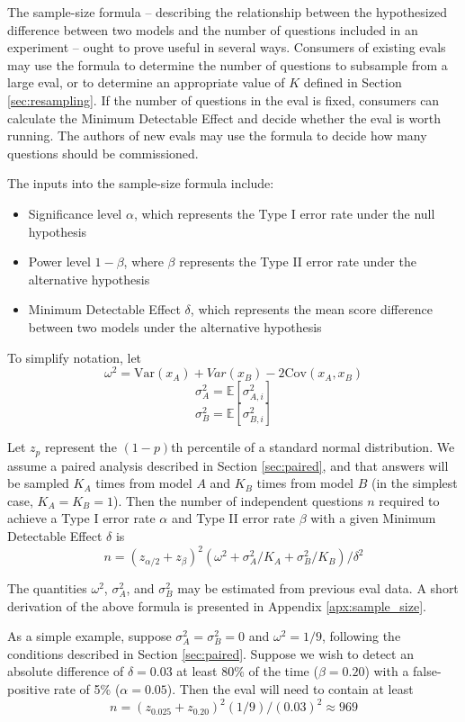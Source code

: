 \documentclass[11pt, oneside]{article}   	%
\newcommand{\E}{\mathbb{E}}
\newcommand{\Var}{\mathrm{Var}}
\newcommand{\Cov}{\mathrm{Cov}}
\begin{document}
The sample-size formula -- describing the relationship between the hypothesized difference between two models and the number of questions included in an experiment -- ought to prove useful in several ways. Consumers of existing evals may use the formula to determine the number of questions to subsample from a large eval, or to determine an appropriate value of $K$ defined in Section \ref{sec:resampling}. If the number of questions in the eval is fixed, consumers can calculate the Minimum Detectable Effect and decide whether the eval is worth running. The authors of new evals may use the formula to decide how many questions should be commissioned.

The inputs into the sample-size formula include:

\begin{itemize}
\item Significance level $\alpha$, which represents the Type I error rate under the null hypothesis
\item Power level $1-\beta$, where $\beta$ represents the Type II error rate under the alternative hypothesis
\item Minimum Detectable Effect $\delta$, which represents the mean score difference between two models under the alternative hypothesis
\end{itemize}

To simplify notation, let
\[
\omega^2 = \Var(x_A) + Var(x_B) - 2\Cov(x_A, x_B)
\]
\[
\sigma_A^2=\E[\sigma_{A, i}^2]
\]
\[
\sigma_B^2=\E[\sigma_{B, i}^2]
\]

Let $z_p$ represent the $(1-p)$th percentile of a standard normal distribution. We assume a paired analysis described in Section \ref{sec:paired}, and that answers will be sampled $K_A$ times from model $A$ and $K_B$ times from model $B$ (in the simplest case, $K_A=K_B=1$). Then the number of independent questions $n$ required to achieve a Type I error rate $\alpha$ and Type II error rate $\beta$ with a given Minimum Detectable Effect $\delta$ is
\begin{equation}
\label{eqn:sample_size}
n=(z_{\alpha/2}+z_\beta)^2(\omega^2+\sigma_A^2/K_A + \sigma_B^2/K_B)/\delta^2
\end{equation}

The quantities $\omega^2$, $\sigma_A^2$, and $\sigma_B^2$ may be estimated from previous eval data. A short derivation of the above formula is presented in Appendix \ref{apx:sample_size}.

As a simple example, suppose $\sigma_A^2=\sigma_B^2=0$ and $\omega^2=1/9$, following the conditions described in Section \ref{sec:paired}. Suppose we wish to detect an absolute difference of $\delta=0.03$ at least 80\% of the time ($\beta=0.20$) with a false-positive rate of 5\% ($\alpha=0.05$). Then the eval will need to contain at least
\[
n=(z_{0.025}+z_{0.20})^2(1/9)/(0.03)^2 \approx 969
\]
\end{document}
